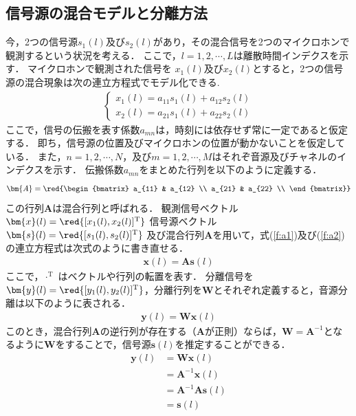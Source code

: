 \subsection{信号源の混合モデルと分離方法}
今，2つの信号源$s_1(l)$及び$s_2(l)$があり，その混合信号を2つのマイクロホンで観測するという状況を考える．
ここで，$l = 1, 2, \cdots , L$は離散時間インデクスを示す．
マイクロホンで観測された信号を
$x_1(l)$及び$x_2(l)$とすると，2つの信号源の混合現象は次の連立方程式でモデル化できる.
\begin{eqnarray}
  \begin{cases}
    x_1(l) = a_{11}s_1(l) + a_{12}s_2(l)  \label{f:a1}\\
    x_2(l) = a_{21}s_1(l) + a_{22}s_2(l)  \label{f:a2}
  \end{cases}
\end{eqnarray}
ここで，信号の伝搬を表す係数$a_{mn}$は，時刻には依存せず常に一定であると仮定する．
即ち，信号源の位置及びマイクロホンの位置が動かないことを仮定している．
また，$n = 1, 2, \cdots , N$，及び$m =
1, 2, \cdots , M $はそれぞ音源及びチャネルのインデクスを示す．
伝搬係数$a_{mn}$をまとめた行列を以下のように定義する．
\begin{align}
    \bm{A} = \red{\begin{bmatrix}
    a_{11}  & a_{12}  \\
    a_{21}  & a_{22}  \\
    \end{bmatrix}}
\end{align}
この行列$\bm{A}$は混合行列と呼ばれる．
観測信号ベクトル$\bm{x}(l) = \red{[x_1(l),x_2(l)]^\mathrm{T}}$
信号源ベクトル$\bm{s}(l) = \red{[s_1(l),s_2(l)]^\mathrm{T}}$
及び混合行列$\bm{A}$を用いて，式(\ref{f:a1})及び(\ref{f:a2})の連立方程式は次式のように書き直せる．
\begin{align}
    \bm{x}(l) = \bm{A}\bm{s}(l)　\label{f:x}
\end{align}
ここで，$\cdot^\mathrm{T}$ はベクトルや行列の転置を表す．
分離信号を$\bm{y}(l) = \red{[y_1(l),y_2(l)]^\mathrm{T}}$，分離行列を$\bm{W}$とそれぞれ定義すると，音源分離は以下のように表される．
\begin{align}
    \bm{y}(l) = \bm{W}\bm{x}(l)
\end{align}
このとき，混合行列$\bm{A}$の逆行列が存在する（$\bm{A}$が正則）ならば，$\bm{W}=\bm{A}^{-1}$となるように$\bm{W}$をすることで，信号源$\bm{s}(l)$を推定することができる．
\begin{align}
    \bm{y}(l) &= \bm{W}\bm{x}(l)\\
    &= \bm{A}^{-1}\bm{x}(l)\\
    &= \bm{A}^{-1}\bm{A}\bm{s}(l)\\
    &= \bm{s}(l)
\end{align}

